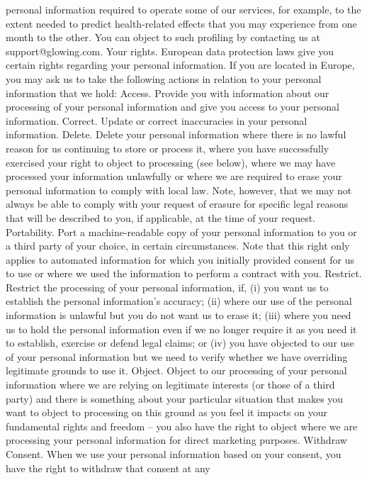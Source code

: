 personal information required to operate some of our services, for
example, to the extent needed to predict health-related effects that you
may experience from one month to the other. You can object to such
profiling by contacting us at support@glowing.com.
Your rights. European data protection laws give you certain rights
regarding your personal information. If you are located in Europe, you
may ask us to take the following actions in relation to your personal
information that we hold:
Access. Provide you with information about our processing of your
personal information and give you access to your personal
information.
Correct. Update or correct inaccuracies in your personal
information.
Delete. Delete your personal information where there is no lawful
reason for us continuing to store or process it, where you have
successfully exercised your right to object to processing (see
below), where we may have processed your information unlawfully
or where we are required to erase your personal information to
comply with local law. Note, however, that we may not always be
able to comply with your request of erasure for specific legal
reasons that will be described to you, if applicable, at the time of
your request.
Portability. Port a machine-readable copy of your personal
information to you or a third party of your choice, in certain
circumstances. Note that this right only applies to automated
information for which you initially provided consent for us to use or
where we used the information to perform a contract with you.
Restrict. Restrict the processing of your personal information, if, (i)
you want us to establish the personal information’s accuracy; (ii)
where our use of the personal information is unlawful but you do
not want us to erase it; (iii) where you need us to hold the personal
information even if we no longer require it as you need it to
establish, exercise or defend legal claims; or (iv) you have objected
to our use of your personal information but we need to verify
whether we have overriding legitimate grounds to use it.
Object. Object to our processing of your personal information
where we are relying on legitimate interests (or those of a third
party) and there is something about your particular situation that
makes you want to object to processing on this ground as you feel
it impacts on your fundamental rights and freedom – you also have
the right to object where we are processing your personal
information for direct marketing purposes.
Withdraw Consent. When we use your personal information based
on your consent, you have the right to withdraw that consent at any

